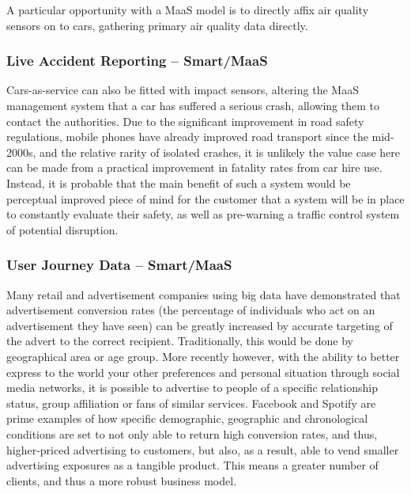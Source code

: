 \documentclass[journal]{IEEEtran}
\begin{document}
A particular opportunity with a MaaS model is to directly affix air
quality sensors on to cars, gathering primary air quality data
directly.


\subsubsection{Live Accident Reporting -- Smart/MaaS}

Cars-as-service can also be fitted with impact sensors, altering the
MaaS management system that a car has suffered a serious crash,
allowing them to contact the authorities. Due to the significant
improvement in road safety regulations, mobile phones have already
improved road transport since the mid-2000s, and the relative rarity
of isolated crashes, it is unlikely the value case here can be made
from a practical improvement in fatality rates from car hire
use. Instead, it is probable that the main benefit of such a system
would be perceptual improved piece of mind for the customer that a
system will be in place to constantly evaluate their safety, as well
as pre-warning a traffic control system of potential disruption.


\subsubsection{User Journey Data – Smart/MaaS}

Many retail and advertisement companies using big data have
demonstrated that advertisement conversion rates (the percentage of
individuals who act on an advertisement they have seen) can be greatly
increased by accurate targeting of the advert to the correct
recipient. Traditionally, this would be done by geographical area or
age group. More recently however, with the ability to better express
to the world your other preferences and personal situation through
social media networks, it is possible to advertise to people of a
specific relationship status, group affiliation or fans of similar
services. Facebook and Spotify are prime examples of how specific
demographic, geographic and chronological conditions are set to not
only able to return high conversion rates, and thus, higher-priced
advertising to customers, but also, as a result, able to vend smaller
advertising exposures as a tangible product. This means a greater
number of clients, and thus a more robust business model.
\end{document}
